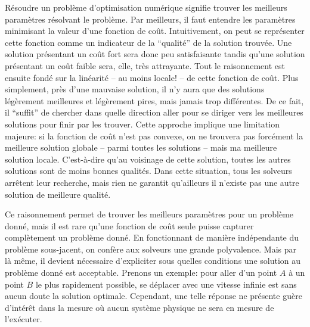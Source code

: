 Résoudre un problème d'optimisation numérique signifie trouver les
meilleurs paramètres résolvant le problème. Par meilleurs, il faut
entendre les paramètres minimisant la valeur d'une fonction de
coût. Intuitivement, on peut se représenter cette fonction comme un
indicateur de la ``qualité'' de la solution trouvée. Une solution
présentant un coût fort sera donc peu satisfaisante tandis qu'une
solution présentant un coût faible sera, elle, très attrayante. Tout
le raisonnement est ensuite fondé sur la linéarité -- au moins locale!
-- de cette fonction de coût. Plus simplement, près d'une mauvaise
solution, il n'y aura que des solutions légèrement meilleures et
légèrement pires, mais jamais trop différentes. De ce fait, il
``suffit'' de chercher dans quelle direction aller pour se diriger
vers les meilleures solutions pour finir par les trouver. Cette
approche implique une limitation majeure: si la fonction de coût n'est
pas convexe, on ne trouvera pas forcément la meilleure solution
globale -- parmi toutes les solutions -- mais ma meilleure solution
locale. C'est-à-dire qu'au voisinage de cette solution, toutes les
autres solutions sont de moins bonnes qualités. Dans cette situation,
tous les solveurs arrêtent leur recherche, mais rien ne garantit
qu'ailleurs il n'existe pas une autre solution de meilleure qualité.


Ce raisonnement permet de trouver les meilleurs paramètres pour un
problème donné, mais il est rare qu'une fonction de coût seule puisse
capturer complètement un problème donné. En fonctionnant de manière
indépendante du problème sous-jacent, on confère aux solveurs une
grande polyvalence. Mais par là même, il devient nécessaire
d'expliciter sous quelles conditions une solution au problème donné
est acceptable. Prenons un exemple: pour aller d'un point $A$ à un
point $B$ le plus rapidement possible, se déplacer avec une vitesse
infinie est sans aucun doute la solution optimale. Cependant, une
telle réponse ne présente guère d'intérêt dans la mesure où aucun
système physique ne sera en mesure de l'exécuter.


